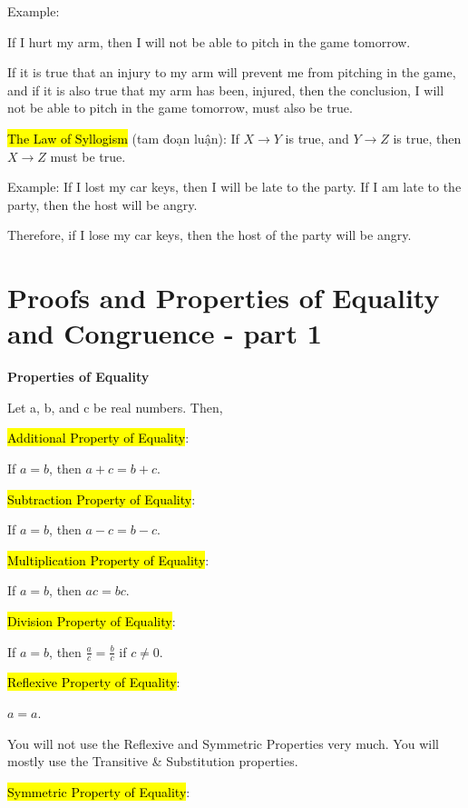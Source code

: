 Example:

If I hurt my arm, then I will not be able to pitch in the game tomorrow.

If it is true that an injury to my arm will prevent me from pitching in the game, and if it is also true that my arm has been, injured, then the conclusion, I will not be able to pitch in the game tomorrow, must also be true.

\vspace{.5cm}

\hl{The Law of Syllogism} (tam đoạn luận): If $X \rightarrow Y$ is true, and $Y \rightarrow Z$ is true, then $X \rightarrow Z$ must be true.

Example: If I lost my car keys, then I will be late to the party. If I am late to the party, then the host will be angry.

Therefore, if I lose my car keys, then the host of the party will be angry.

\section{Proofs and Properties of Equality and Congruence - part 1}

\vspace{0.3 cm}

\centerline{\textbf{\LARGE Properties of Equality}}

\vspace{0.5cm}

Let a, b, and c be real numbers. Then,

\hl{Additional Property of Equality}:

If $a=b$, then $a+c=b+c$.

\hl{Subtraction Property of Equality}:

If $a=b$, then $a-c=b-c$.

\hl{Multiplication Property of Equality}:

If $a=b$, then $ac=bc$.

\hl{Division Property of Equality}:

If $a=b$, then $\frac{a}{c}=\frac{b}{c}$ if $c\neq 0$.

\hl{Reflexive Property of Equality}:

$a=a$.

You will not use the Reflexive and Symmetric Properties very much. You will mostly use the Transitive \& Substitution properties.

\hl{Symmetric Property of Equality}:

